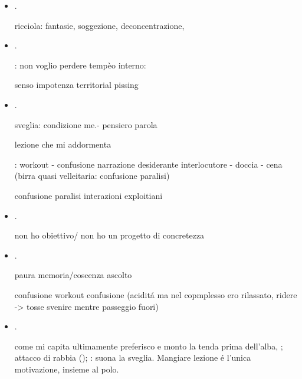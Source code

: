 \begin{itemize}

\item {}.

ricciola: fantasie, soggezione, deconcentrazione, 

\item {}.


: non voglio perdere tempèo interno: 

senso impotenza territorial pissing


\item {}.

sveglia: condizione me.- pensiero parola



lezione che mi addormenta

: workout - confusione narrazione desiderante interlocutore - doccia - cena (birra quasi velleitaria: confusione paralisi)

confusione paralisi interazioni exploitiani

\item {}.


non ho obiettivo/ non ho un progetto di concretezza

\item {}.

paura memoria/coscenza ascolto

confusione workout confusione (acidit\'a ma nel copmplesso ero rilassato, ridere -> tosse svenire mentre passeggio fuori)

\item {}.

come mi capita ultimamente preferisco  e monto la tenda  prima dell'alba, ; attacco di rabbia (); : suona la sveglia. Mangiare lezione \'e l'unica motivazione, insieme al polo.


\end{itemize}
